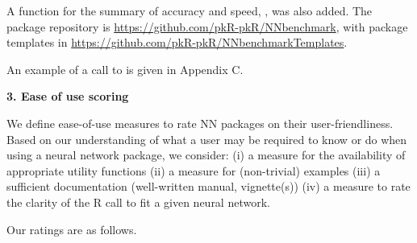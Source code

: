A function for the summary of accuracy and speed, , was
also added. The package repository is
\url{https://github.com/pkR-pkR/NNbenchmark}, with package templates in
\url{https://github.com/pkR-pkR/NNbenchmarkTemplates}.

An example of a call to  is given in Appendix
C.

\textbf{3. Ease of use scoring}

We define ease-of-use measures to rate NN packages on their
user-friendliness. Based on our understanding of what a user may be
required to know or do when using a neural network package, we consider:
(i) a measure for the availability of appropriate utility functions (ii)
a measure for (non-trivial) examples (iii) a sufficient documentation
(well-written manual, vignette(s)) (iv) a measure to rate the clarity of
the R call to fit a given neural network.

Our ratings are as follows.

